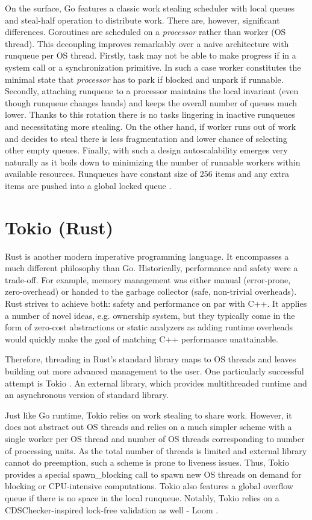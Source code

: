 \documentclass[12pt,a4paper,twoside]{report}
\begin{document}
On the surface, Go features a classic work stealing scheduler with local queues and steal-half operation to distribute work. There are, however, significant differences. Goroutines are scheduled on a \textit{processor} rather than worker (OS thread). This decoupling improves remarkably over a naive architecture with runqueue per OS thread. Firstly, task may not be able to make progress if in a system call or a synchronization primitive. In such a case worker constitutes the minimal state that \textit{processor} has to park if blocked and unpark if runnable. Secondly, attaching runqueue to a processor maintains the local invariant (even though runqueue changes hands) and keeps the overall number of queues much lower. Thanks to this rotation there is no tasks lingering in inactive runqueues and necessitating more stealing. On the other hand, if worker runs out of work and decides to steal there is less fragmentation and lower chance of selecting other empty queues. Finally, with such a design autoscalability emerges very naturally as it boils down to minimizing the number of runnable workers within available resources. Runqueues have constant size of 256 items and any extra items are pushed into a global locked queue \cite{goprocgo7:online}. 


\section{Tokio (Rust)}
\label{section:rel-work-rust}
Rust is another modern imperative programming language. It encompasses a much different philosophy than Go. Historically, performance and safety were a trade-off. For example, memory management was either manual (error-prone, zero-overhead) or handed to the garbage collector (safe, non-trivial overheads). Rust strives to achieve both: safety and performance on par with C++. It applies a number of novel ideas, e.g. ownership system, but they typically come in the form of zero-cost abstractions or static analyzers as adding runtime overheads would quickly make the goal of matching C++ performance unattainable. 

Therefore, threading in Rust's standard library maps to OS threads and leaves building out more advanced management to the user. One particularly successful attempt is Tokio \cite{TokioAna8:online}. An external library, which provides multithreaded runtime and an asynchronous version of standard library.

Just like Go runtime, Tokio relies on work stealing to share work. However, it does not abstract out OS threads and relies on a much simpler scheme with a single worker per OS thread and number of OS threads corresponding to number of processing units. As the total number of threads is limited and external library cannot do preemption, such a scheme is prone to liveness issues. Thus, Tokio provides a special spawn\_blocking call to spawn new OS threads on demand for blocking or CPU-intensive computations. Tokio also features a global overflow queue if there is no space in the local runqueue. Notably, Tokio relies on a CDSChecker-inspired lock-free validation as well - Loom \cite{tokiorsl53:online}.
\end{document}
